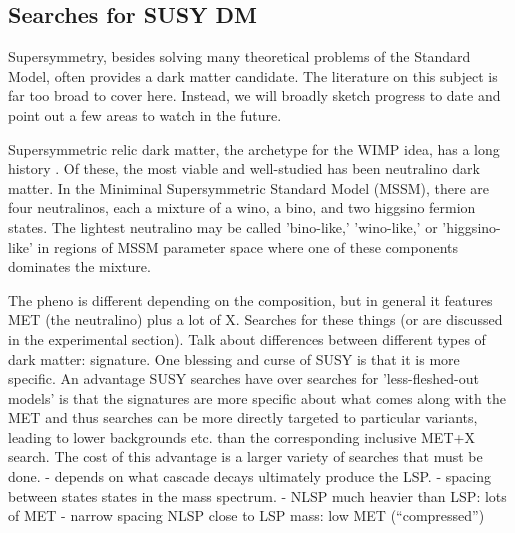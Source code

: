 

 




\subsection{Searches for SUSY DM}
\label{sec:results_SUSYSearches}

Supersymmetry, besides solving many theoretical problems of the Standard Model, often provides a dark matter candidate. The literature on this subject is far too broad to cover here. Instead, we will broadly sketch progress to date and point out a few areas to watch in the future.

Supersymmetric relic dark matter, the archetype for the WIMP idea, has a long history \cite{doi:10.1016/0550-3213(84)90461-9}. Of these, the most viable and well-studied has been neutralino dark matter. In the Miniminal Supersymmetric Standard Model (MSSM), there are four neutralinos, each a mixture of a wino, a bino, and two higgsino fermion states. The lightest neutralino may be called 'bino-like,' 'wino-like,' or 'higgsino-like' in regions of MSSM parameter space where one of these components dominates the mixture.

The pheno is different depending on the composition, but in general it features MET (the neutralino) plus a lot of X. 
Searches for these things \cite{} (or are discussed in the experimental section).
Talk about differences between different types of dark matter: signature.
One blessing and curse of SUSY is that it is more specific.
An advantage SUSY searches have over searches for 'less-fleshed-out models' is that the signatures are more specific about what comes along with the MET and thus searches can be more directly targeted to particular variants, leading to lower backgrounds etc. than the corresponding inclusive MET+X search. The cost of this advantage is a larger variety of searches that must be done. 
- depends on what cascade decays ultimately produce the LSP.
- spacing between states states in the mass spectrum.
  - NLSP much heavier than LSP: lots of MET
  - narrow spacing NLSP close to LSP mass: low MET (``compressed'')

